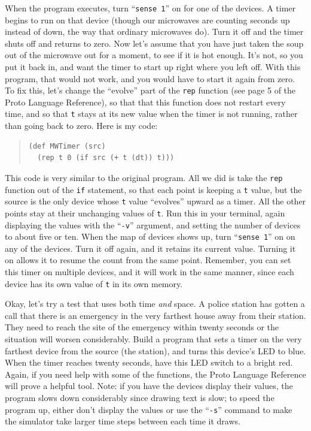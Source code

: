 \documentclass{article}
\newcommand\var[1]{{\tt #1}}
\newcommand\qvar[1]{``{\tt #1}''}
\begin{document}
{When the program executes, turn \qvar{sense 1} on for one of the
devices.  A timer begins to run on that device (though our microwaves
are counting seconds up instead of down, the way that ordinary
microwaves do).  Turn it off and the timer shuts off and returns to
zero.  Now let's assume that you have just taken the soup out of the
microwave out for a moment, to see if it is hot enough.  It's not, so
you put it back in, and want the timer to start up right where you
left off.  With this program, that would not work, and you would have
to start it again from zero.  To fix this, let's change the ``evolve''
part of the \var{rep} function (see page 5 of the Proto Language
Reference), so that that this function does not restart every time,
and so that \var{t} stays at its new value when the timer is not
running, rather than going back to zero. Here is my code:

\begin{quote}
\begin{verbatim}
(def MWTimer (src) 
  (rep t 0 (if src (+ t (dt)) t)))
\end{verbatim}
\end{quote}

This code is very similar to the original program. All we did is take
the \var{rep} function out of the \var{if} statement, so that each
point is keeping a \var{t} value, but the source is the only device
whose \var{t} value ``evolves'' upward as a timer.  All the other
points stay at their unchanging values of \var{t}.  Run this in your
terminal, again displaying the values with the \qvar{-v} argument, and
setting the number of devices to about five or ten.  When the map of
devices shows up, turn \qvar{sense 1} on on any of the devices.  Turn
it off again, and it retains its current value.  Turning it on allows
it to resume the count from the same point.  Remember, you can set
this timer on multiple devices, and it will work in the same manner,
since each device has its own value of \var{t} in its own memory.

Okay, let's try a test that uses both time {\em and} space.  A police
station has gotten a call that there is an emergency in the very
farthest house away from their station.  They need to reach the site
of the emergency within twenty seconds or the situation will worsen
considerably.  Build a program that sets a timer on the very farthest
device from the source (the station), and turns this device's LED to
blue.  When the timer reaches twenty seconds, have this LED switch to
a bright red.  Again, if you need help with some of the functions, the
Proto Language Reference will prove a helpful tool.  Note: if you have
the devices display their values, the program slows down considerably
since drawing text is slow; to speed the program up, either don't
display the values or use the \qvar{-s} command to make the simulator
take larger time steps between each time it draws.

}
\end{document}
